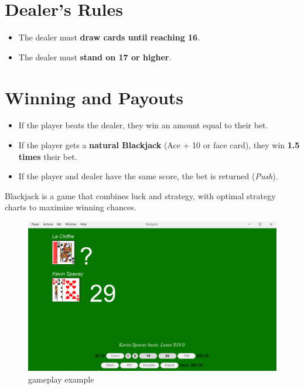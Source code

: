 \section{Dealer's Rules}

\begin{itemize}
    \item The dealer must \textbf{draw cards until reaching 16}.
    \item The dealer must \textbf{stand on 17 or higher}.
\end{itemize}

\section{Winning and Payouts}

\begin{itemize}
    \item If the player beats the dealer, they win an amount equal to their bet.
    \item If the player gets a \textbf{natural Blackjack} (Ace + 10 or face card), they win \textbf{1.5 times} their bet.
    \item If the player and dealer have the same score, the bet is returned (\textit{Push}).
\end{itemize}

Blackjack is a game that combines luck and strategy, with optimal strategy charts to maximize winning chances.

\begin{figure}[!htb]
    \centering
    \includegraphics[scale=0.55]{report/img/screeen.png}
    \caption{gameplay example}
    \label{fig:scren1}
\end{figure}


